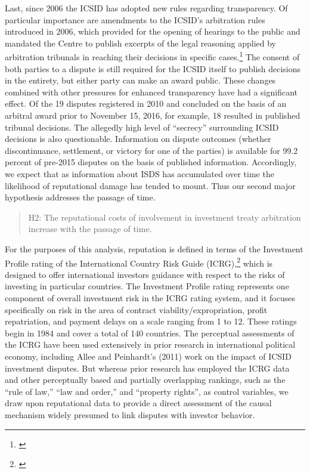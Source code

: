 \documentclass[12pt,onesided]{amsart}
\begin{document}
Last, since 2006 the ICSID has adopted new rules regarding transparency. Of particular importance are amendments to the ICSID's arbitration rules introduced in 2006, which provided for the opening of hearings to the public and mandated the Centre to publish excerpts of the legal reasoning applied by arbitration tribunals in reaching their decisions in specific cases.\footnote{\citet{antonietti:2006,yackee20112006}} The consent of both parties to a dispute is still required for the ICSID itself to publish decisions in the entirety, but either party can make an award public. These changes combined with other pressures for enhanced transparency have had a significant effect. Of the 19 disputes registered in 2010 and concluded on the basis of an arbitral award prior to November 15, 2016, for example, 18 resulted in published tribunal decisions. The allegedly high level of ``secrecy'' surrounding ICSID decisions is also questionable. Information on dispute outcomes (whether discontinuance, settlement, or victory for one of the parties) is available for 99.2 percent of pre-2015 disputes on the basis of published information. Accordingly, we expect that as information about ISDS has accumulated over time the likelihood of reputational damage has tended to mount. Thus our second major hypothesis addresses the passage of time. 

\begin{quote}
H2: The reputational costs of involvement in investment treaty arbitration increase with the passage of time.
\end{quote}

For the purposes of this analysis, reputation is defined in terms of the Investment Profile rating of the International Country Risk Guide (ICRG),\footnote{\citet{prs:2013}} which is designed to offer international investors guidance with respect to the risks of investing in particular countries. The Investment Profile rating represents one component of overall investment risk in the ICRG rating system, and it focuses specifically on risk in the area of contract viability/expropriation, profit repatriation, and payment delays on a scale ranging from 1 to 12. These ratings begin in 1984 and cover a total of 140 countries. The perceptual assessments of the ICRG have been used extensively in prior research in international political economy, including Allee and Peinhardt's (2011) work on the impact of ICSID investment disputes. But whereas prior research has employed the ICRG data and other perceptually based and partially overlapping rankings, such as the ``rule of law,'' ``law and order,'' and ``property rights'', as control variables, we draw upon reputational data to provide a direct assessment of the causal mechanism widely presumed to link disputes with investor behavior.
\end{document}
